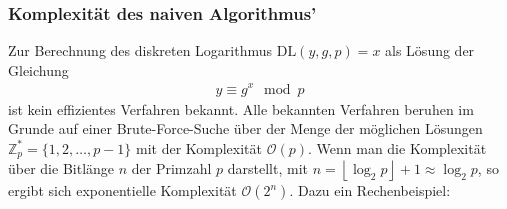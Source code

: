 \documentclass[
  a4paper,
  11pt,
]{scrartcl}
\theoremstyle{plain}
\theoremstyle{definition}
\theoremstyle{remark}
\newcommand{\Z}{\mathbb{Z}}
\begin{document}
\subsubsection{Komplexität des naiven Algorithmus’}
\label{ssub:komplexitaet_naiver_algorithmus}

Zur Berechnung des diskreten Logarithmus $\text{DL}(y,g,p) = x$ als Lösung der
Gleichung
\begin{align*}
  y \equiv g^x \mod p
\end{align*}
ist kein effizientes Verfahren bekannt.
Alle bekannten Verfahren beruhen im Grunde auf einer Brute-Force-Suche über der
Menge der möglichen Lösungen $\Z_p^* = \{1, 2, \ldots, p-1\}$ mit der
Komplexität $\mathcal{O}(p)$.
Wenn man die Komplexität über die Bitlänge $n$ der Primzahl $p$ darstellt, mit
$n = \left\lfloor \log_2 p \right\rfloor + 1 \approx \log_2 p$, so ergibt sich
exponentielle Komplexität $\mathcal{O}(2^n)$. Dazu ein Rechenbeispiel:
\end{document}
